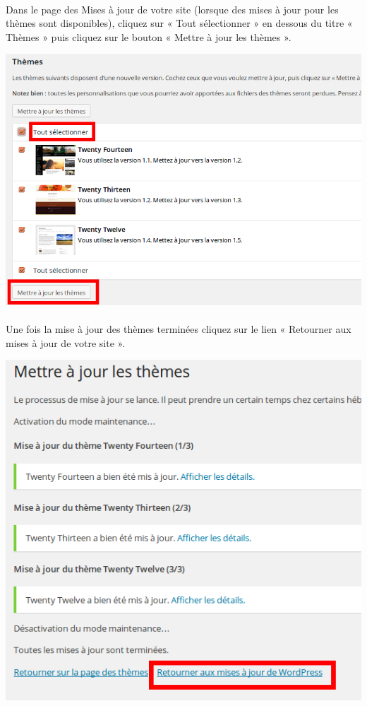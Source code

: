 \documentclass[10pt,a4paper]{article}
\begin{document}
\paragraph{}Dans le page des Mises à jour de votre site (lorsque des mises à jour pour les thèmes sont disponibles), cliquez sur « Tout sélectionner » en dessous du titre « Thèmes » puis cliquez sur le bouton « Mettre à jour les thèmes ».
\begin{center}
\includegraphics[scale=0.35]{img/0055.png}
\end{center}
\paragraph{}Une fois la mise à jour des thèmes terminées cliquez sur le lien « Retourner aux mises à jour de votre site ».
\begin{center}
\includegraphics[scale=0.35]{img/0056.png}
\end{center}
\end{document}
